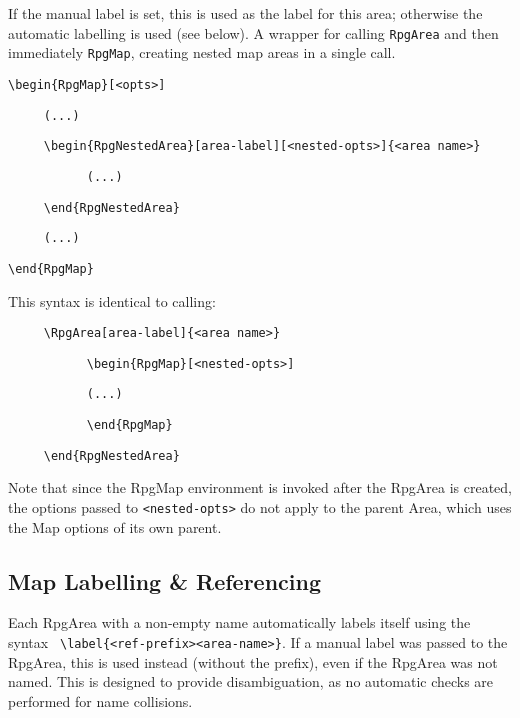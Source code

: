\begin{macrolist}
{			If the manual label is set, this is used as the label for this area; otherwise the automatic labelling is used (see below).
		}
		{
			A wrapper for calling \verb|RpgArea| and then immediately \verb|RpgMap|, creating nested map areas in a single call.
		}
		{
			\verb|\begin{RpgMap}[<opts>]|

				\verb|     (...)|

				\quad\verb|     \begin{RpgNestedArea}[area-label][<nested-opts>]{<area name>}|

				\quad\quad\verb|           (...)|

				\quad\verb|     \end{RpgNestedArea}|		

				\verb|     (...)|
				
				\verb|\end{RpgMap}|		
		}{
			This syntax is identical to calling:

			\quad\verb|     \RpgArea[area-label]{<area name>}|

			\quad\quad\verb|           \begin{RpgMap}[<nested-opts>]|
			
			\quad	\quad\quad\verb|           (...)|

			\quad\quad\verb|           \end{RpgMap}|

			\quad\verb|     \end{RpgNestedArea}|	

			Note that since the RpgMap environment is invoked after the RpgArea is created, the options passed to \verb|<nested-opts>| do not apply to the parent Area, which uses the Map options of its own parent.
		}
		\end{macrolist}


		\subsection{Map Labelling \& Referencing}
		
			Each RpgArea with a non-empty name automatically labels itself using the syntax	\verb| \label{<ref-prefix><area-name>}|. If a manual label was passed to the RpgArea, this is used instead (without the prefix), even if the RpgArea was not named. This is designed to provide disambiguation, as no automatic checks are performed for name collisions. 

